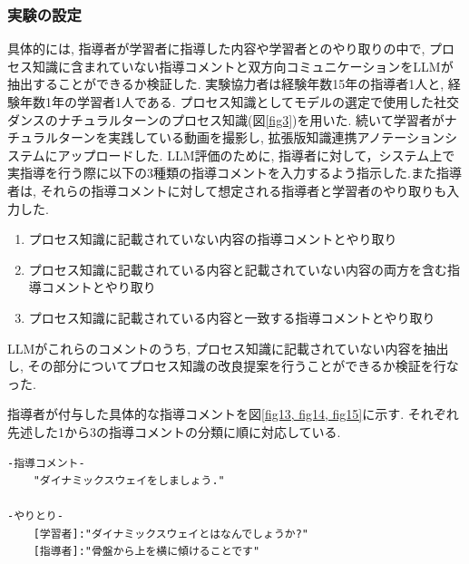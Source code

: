\subsubsection{実験の設定}
具体的には, 指導者が学習者に指導した内容や学習者とのやり取りの中で, プロセス知識に含まれていない指導コメントと双方向コミュニケーションをLLMが抽出することができるか検証した. 実験協力者は経験年数15年の指導者1人と, 経験年数1年の学習者1人である. プロセス知識としてモデルの選定で使用した社交ダンスのナチュラルターンのプロセス知識(図\ref{fig3})を用いた. 続いて学習者がナチュラルターンを実践している動画を撮影し, 拡張版知識連携アノテーションシステムにアップロードした. LLM評価のために, 指導者に対して，システム上で実指導を行う際に以下の3種類の指導コメントを入力するよう指示した.また指導者は, それらの指導コメントに対して想定される指導者と学習者のやり取りも入力した.

\begin{enumerate}
    \item プロセス知識に記載されていない内容の指導コメントとやり取り
    
    \item プロセス知識に記載されている内容と記載されていない内容の両方を含む指導コメントとやり取り
    
    \item プロセス知識に記載されている内容と一致する指導コメントとやり取り
    
\end{enumerate}

LLMがこれらのコメントのうち, プロセス知識に記載されていない内容を抽出し, その部分についてプロセス知識の改良提案を行うことができるか検証を行なった. 

指導者が付与した具体的な指導コメントを図\ref{fig13, fig14, fig15}に示す. それぞれ先述した1から3の指導コメントの分類に順に対応している.


\begin{tcolorbox}[breakable, colback=white, colframe=black]
    \begin{verbatim}
-指導コメント- 
    "ダイナミックスウェイをしましょう."

-やりとり- 
    [学習者]:"ダイナミックスウェイとはなんでしょうか?" 
    [指導者]:"骨盤から上を横に傾けることです" 
    \end{verbatim}
\end{tcolorbox}
    
\label{fig13}




